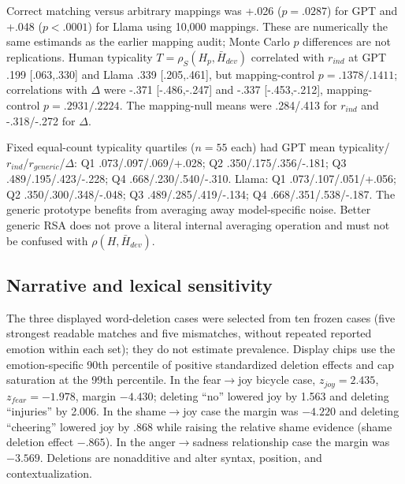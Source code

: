 Correct matching versus arbitrary mappings was +.026 ($p=.0287$) for GPT and +.048 ($p<.0001$) for Llama using 10,000 mappings. These are numerically the same estimands as the earlier mapping audit; Monte Carlo $p$ differences are not replications. Human typicality $T=\rho_S(H_p,\bar H_{dev})$ correlated with $r_{ind}$ at GPT .199 [.063,.330] and Llama .339 [.205,.461], but mapping-control $p=.1378/.1411$; correlations with $\Delta$ were -.371 [-.486,-.247] and -.337 [-.453,-.212], mapping-control $p=.2931/.2224$. The mapping-null means were .284/.413 for $r_{ind}$ and -.318/-.272 for $\Delta$.

Fixed equal-count typicality quartiles ($n=55$ each) had GPT mean typicality/$r_{ind}$/$r_{generic}$/$\Delta$: Q1 .073/.097/.069/+.028; Q2 .350/.175/.356/-.181; Q3 .489/.195/.423/-.228; Q4 .668/.230/.540/-.310. Llama: Q1 .073/.107/.051/+.056; Q2 .350/.300/.348/-.048; Q3 .489/.285/.419/-.134; Q4 .668/.351/.538/-.187. The generic prototype benefits from averaging away model-specific noise. Better generic RSA does not prove a literal internal averaging operation and must not be confused with $\rho(H,\bar H_{dev})$.

\subsection{Narrative and lexical sensitivity}
\label{app:narrative}

The three displayed word-deletion cases were selected from ten frozen cases (five strongest readable matches and five mismatches, without repeated reported emotion within each set); they do not estimate prevalence. Display chips use the emotion-specific 90th percentile of positive standardized deletion effects and cap saturation at the 99th percentile. In the fear$\rightarrow$joy bicycle case, $z_{joy}=2.435$, $z_{fear}=-1.978$, margin $-4.430$; deleting ``no'' lowered joy by 1.563 and deleting ``injuries'' by 2.006. In the shame$\rightarrow$joy case the margin was $-4.220$ and deleting ``cheering'' lowered joy by .868 while raising the relative shame evidence (shame deletion effect $-.865$). In the anger$\rightarrow$sadness relationship case the margin was $-3.569$. Deletions are nonadditive and alter syntax, position, and contextualization.

